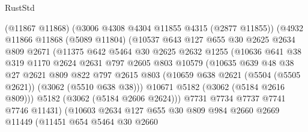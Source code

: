 \begin{lexlean}{RustStd}
\begin{coremodule}
                      (@11867 @11868)
                      (@3006 @4308 @4304 @11855 @4315 (@2877 @11855))
                      (@4932
                        @11866
                        @11868
                        (@5089 @11804)
                        (@10537
                          @643
                          @127
                          @655
                          @30
                          @2625
                          @2634
                          @809
                          @2671
                          (@11375
                            @642
                            @5464
                            @30
                            @2625
                            @2632
                            @1255
                            (@10636
                              @641
                              @38
                              @319
                              @1170
                              @2624
                              @2631
                              @797
                              @2605
                              @803
                              @10579
                              (@10635
                                @639
                                @48
                                @38
                                @27
                                @2621
                                @809
                                @822
                                @797
                                @2615
                                @803
                                (@10659 @638 @2621 (@5504 (@5505 @2621)) (@3062 (@5510 @638 @38)))
                                @10671
                                @5182
                                (@3062 (@5184 @2616 @809)))
                              @5182
                              (@3062 (@5184 @2606 @2624)))
                            @7731
                            @7734
                            @7737
                            @7741
                            @7746
                            @11431)
                          (@10603
                            @2634
                            @127
                            @655
                            @30
                            @809
                            @984
                            @2660
                            @2669
                            @11449
                            (@11451
                              @654
                              @5464
                              @30
                              @2660

\end{coremodule}
\end{lexlean}
